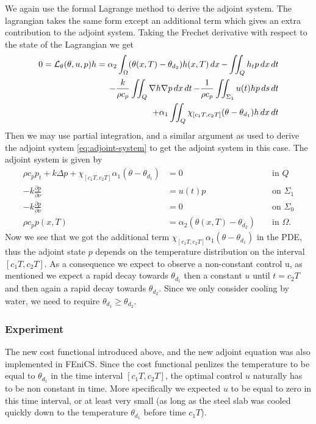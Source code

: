 We again use the formal Lagrange method to derive the adjoint system. The lagrangian takes the same form except an additional term which gives an extra contribution to the adjoint system. Taking the Frechet derivative with respect to the state of the Lagrangian we get
\begin{equation}
  \begin{aligned}
  0 = \mathcal{L}_\theta(\theta, u, p)h = \alpha_2 \int_\Omega (\theta(x,T) - \theta_{d_2})h(x, T)\mathop{dx} - \iint_Q h_t p\mathop{dx}\mathop{dt} \\
  - \frac{k}{\rho c_p}\iint_Q\nabla h\nabla p \mathop{dx}\mathop{dt}
  - \frac{1}{\rho c_p}\iint_{\Sigma_1} u(t)h p\mathop{ds}\mathop{dt} \\
  + \alpha_1 \iint_{Q}\chi_{[c_1T,c_2T]}(\theta - \theta_{d_1})h \mathop{dx}\mathop{dt}
  \end{aligned}
\end{equation}
Then we may use partial integration, and a similar argument as used to derive the adjoint system \eqref{eq:adjoint-system} to get the adjoint system in this case. The adjoint system is given by 
\begin{subequations}
   \begin{align*} 
      \rho c_p p_t + k\Delta p + \chi_{[c_1T,c_2T]}\alpha_1(\theta - \theta_{d_1})&= 0 &&\textrm{ in } Q  \\
      {-k}\frac{\partial p}{\partial\nu} &= u(t)p &&\textrm{ on } \Sigma_1  \\
      {-k}\frac{\partial p}{\partial\nu} &= 0 &&\textrm{ on } \Sigma_0  \\
      \rho c_p p(x, T) &= \alpha_2(\theta(x, T) - \theta_{d_2})  &&\textrm{ in } \Omega.
   \end{align*}
\end{subequations}
Now we see that we got the additional term $\chi_{[c_1T,c_2T]}\alpha_1(\theta-\theta_{d_1})$ in the PDE, thus the adjoint state $p$ depends on the temperature distribution on the interval $[c_1T,c_2T]$. As a consequence we expect to observe a non-constant control u, as mentioned we expect a rapid decay towards $\theta_{d_1}$ then a constant $u$ until $t=c_2T$ and then again a rapid decay towards $\theta_{d_2}$. Since we only consider cooling by water, we need to require $\theta_{d_1} \geq \theta_{d_2}$.

\subsubsection{Experiment}

The new cost functional introduced above, and the new adjoint equation was also implemented in FEniCS. Since the cost functional penlizes the temperature to be equal to $\theta_{d_1}$ in the time interval $[c_1 T, c_2 T]$, the optimal control $u$ naturally has to be non constant in time. More specifically we expected $u$ to be equal to zero in this time interval, or at least very small (as long as the steel slab was cooled quickly down to the temperature $\theta_{d_1}$ before time $c_1 T$). 

